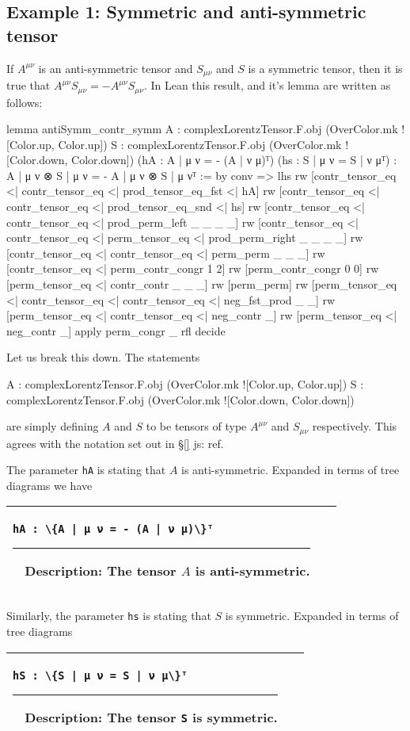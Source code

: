 \documentclass[a4paper, 11pt]{article}
\newcommand{\js}[1]{ {\color{magenta} js:  #1}}
\newcommand{\proofstep}[3]{
  \arrayrulecolor{mycolor}
\begin{center}
\begin{tabular}{|p{3in}| p{3in}|}
\hline
{#1
}\newline 
\hrule~\newline
#2
  & ~\newline
\makebox[3in]{%
#3}
  \\ \hline
\end{tabular}
\end{center}
\arrayrulecolor{black}
}
\begin{document}
\subsection{Example 1: Symmetric and anti-symmetric tensor} \label{sec:exampleSymmAntiSymm}
If $A^{\mu \nu}$ is an anti-symmetric tensor and $S_{\mu \nu}$ and $S$ is a symmetric tensor, then
it is true that $A^{\mu \nu} S_{\mu \nu} = - A^{\mu \nu} S_{\mu \nu}$. In Lean this result, and 
it's lemma are written as follows: 
\begin{code}
lemma antiSymm_contr_symm 
    {A : complexLorentzTensor.F.obj (OverColor.mk ![Color.up, Color.up])}
    {S : complexLorentzTensor.F.obj (OverColor.mk ![Color.down, Color.down])}
    (hA : {A | μ ν = - (A | ν μ)}ᵀ) (hs : {S | μ ν = S | ν μ}ᵀ) :
    {A | μ ν ⊗ S | μ ν = - A | μ ν ⊗ S | μ ν}ᵀ := by
  conv =>
    lhs
    rw [contr_tensor_eq <| contr_tensor_eq <| prod_tensor_eq_fst <| hA]
    rw [contr_tensor_eq <| contr_tensor_eq <| prod_tensor_eq_snd <| hs]
    rw [contr_tensor_eq <| contr_tensor_eq <| prod_perm_left _ _ _ _]
    rw [contr_tensor_eq <| contr_tensor_eq <| perm_tensor_eq <| prod_perm_right _ _ _ _]
    rw [contr_tensor_eq <| contr_tensor_eq <| perm_perm _ _ _]
    rw [contr_tensor_eq <| perm_contr_congr 1 2]
    rw [perm_contr_congr 0 0]
    rw [perm_tensor_eq <| contr_contr _ _ _]
    rw [perm_perm]
    rw [perm_tensor_eq <| contr_tensor_eq <| contr_tensor_eq <| neg_fst_prod _ _]
    rw [perm_tensor_eq <| contr_tensor_eq <| neg_contr _]
    rw [perm_tensor_eq <| neg_contr _]
  apply perm_congr _ rfl
  decide
\end{code}
Let us break this down. The statements 
\begin{code} 
{A : complexLorentzTensor.F.obj (OverColor.mk ![Color.up, Color.up])}
{S : complexLorentzTensor.F.obj (OverColor.mk ![Color.down, Color.down])}
\end{code}
are simply defining $A$ and $S$ to be tensors of type $A^{\mu \nu}$ and $S_{\mu \nu}$ respectively.
This agrees with the notation set out in \S\ref{} \js{ref}.

The parameter \lstinline|hA| is stating that $A$ is anti-symmetric. Expanded in terms of tree diagrams 
we have
\proofstep{\lstinline!hA : \{A | μ ν = - (A | ν μ)\}ᵀ!}{Description: The tensor $A$ 
  is anti-symmetric.}{
 \begin{tikzpicture}
    \node[draw=black] (A) at (-2,-1) {A};
    \node[draw=black] (D1) at (0,0) {perm};
    \node[draw=black] (E1) at (0,-1) {neg};
    \node[draw=black] (F1) at (0,-2) {A};
    \node (eq) at (-1, -1) {$=$};
    \path [->] (D1) edge (E1);
    \path [->] (E1) edge (F1);
  \end{tikzpicture} 
}
Similarly, the parameter \lstinline|hs| is stating that $S$ is symmetric. Expanded in terms of tree diagrams
\proofstep{\lstinline!hS : \{S | μ ν = S | ν μ\}ᵀ!}{Description: The tensor \lstinline|S|
  is symmetric.}{
 \begin{tikzpicture}
    \node[draw=black] (A) at (-2,-0.5) {S};
    \node[draw=black] (D1) at (0,0) {perm};
    \node[draw=black] (F1) at (0,-1) {S};
    \node (eq) at (-1, -0.5) {$=$};
    \path [->] (D1) edge (F1);
  \end{tikzpicture} 
}
\end{document}
